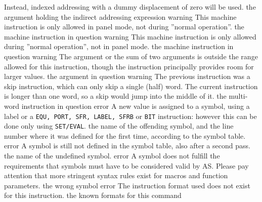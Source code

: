 \documentclass[12pt,twoside]{report}
\newcommand{\tty}[1]{{\tt #1}}
\begin{document}
\begin{description}
{                Instead, indexed addressing with a dummy displacement of
                zero will be used.}
               {the argument holding the indirect addressing expression}
               {warning}
               {This machine instruction is only allowed in panel mode,
                not during ''normal operation''.}
               {the machine instruction in question}
               {warning}
               {This machine instruction is only allowed during ''normal
                operation'', not in panel mode.}
               {the machine instruction in question}
               {warning}
               {The argument or the sum of two arguments is outside the
                range allowed for this instruction, though the instruction
                principally provides room for larger values.}
               {the argument in question}
               {warning}
               {The previous instruction was a skip instruction, which
                can only skip a single (half) word.  The current instruction
                is longer than one word, so a skip would jump into the middle
                of it.}
               {the multi-word instruction in question}
               {error}
               {A new value is assigned to a symbol, using a label or a
                \tty{EQU, PORT, SFR, LABEL, SFRB} or \tty{BIT} instruction: however this
                can be done only using \tty{SET/EVAL}.}
               {the name of the offending symbol, and the line number where
                it was defined for the first time, according to the symbol
                table.}
               {error}
               {A symbol is still not defined in the symbol table, also
                after a second pass.}
               {the name of the undefined symbol.}
               {error}
               {A symbol does not fulfill the requirements that symbols
                must have to be considered valid by AS. Please pay
                attention that more stringent syntax rules exist for
                macros and function parameters.}
               {the wrong symbol}
               {error}
               {The instruction format used does not exist for this
                instruction.}
               {the known formats for this command}

\end{description}
\end{document}
